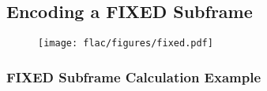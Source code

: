 
\subsection{Encoding a FIXED Subframe}
\label{flac:encode_fixed_subframe}
{
  
}
\begin{figure}[h]
  \texttt{[image: flac/figures/fixed.pdf]}
\end{figure}

\clearpage

\subsubsection{FIXED Subframe Calculation Example}

